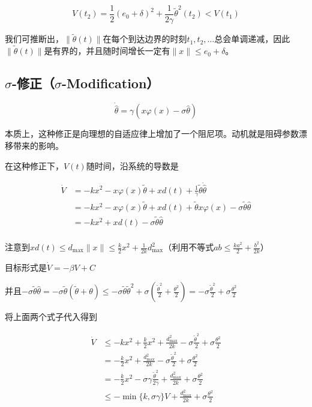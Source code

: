 \[V(t_{2}) = \frac{1}{2}(e_{0} + \delta)^{2} + \frac{1}{2\gamma}{\tilde{\theta}}^{2}(t_{2}) < V(t_{1})\]

我们可推断出，\(\parallel \tilde{\theta}(t) \parallel\)在每个到达边界的时刻\(t_{1},t_{2},\ldots\)总会单调递减，因此\(\parallel \tilde{\theta}(t) \parallel\)是有界的，并且随时间增长一定有\(\parallel x \parallel \leq e_{0} + \delta\)。

\subsection{\texorpdfstring{$\sigma$-修正（$\sigma$-Modification）}{σ-修正（σ-Modification）}}

\[\dot{\hat{\theta}} = \gamma(x\varphi(x) - \sigma\hat{\theta})\]

本质上，这种修正是向理想的自适应律上增加了一个阻尼项。动机就是阻碍参数漂移带来的影响。

在这种修正下，\(V(t)\)随时间，沿系统的导数是

\[\begin{matrix}
\dot{V} & = - kx^{2} - x\varphi(x)\tilde{\theta} + xd(t) + \frac{1}{\gamma}\tilde{\theta}\dot{\hat{\theta}} \\
 & = - kx^{2} - x\varphi(x)\tilde{\theta} + xd(t) + \tilde{\theta}x\varphi(x) - \sigma\tilde{\theta}\hat{\theta} \\
 & = - kx^{2} + xd(t) - \sigma\tilde{\theta}\hat{\theta} \\
\end{matrix}\]

注意到\(xd(t) \leq d_{\max} \parallel x \parallel \leq \frac{k}{2}x^{2} + \frac{1}{2k}d_{\max}^{2}\)（利用不等式\(ab \leq \frac{ka^{2}}{2} + \frac{b^{2}}{2k}\)）

目标形式是\(\dot{V} = - \beta V + C\)

并且\(- \sigma\tilde{\theta}\hat{\theta} = - \sigma\tilde{\theta}(\tilde{\theta} + \theta) \leq - \sigma\tilde{\theta}{\tilde{\theta}}^{2} + \sigma(\frac{{\tilde{\theta}}^{2}}{2} + \frac{\theta^{2}}{2}) = - \sigma\frac{{\tilde{\theta}}^{2}}{2} + \sigma\frac{\theta^{2}}{2}\)

将上面两个式子代入得到

\begin{align*}
\dot{V} & \leq - kx^{2} + \frac{k}{2}x^{2} + \frac{d_{\max}^{2}}{2k} - \sigma\frac{{\tilde{\theta}}^{2}}{2} + \sigma\frac{\theta^{2}}{2} \\
 & = - \frac{k}{2}x^{2} + \frac{d_{\max}^{2}}{2k} - \sigma\frac{{\tilde{\theta}}^{2}}{2} + \sigma\frac{\theta^{2}}{2} \\
 & = - \frac{k}{2}x^{2} - \sigma\gamma\frac{{\tilde{\theta}}^{2}}{2\gamma} + \frac{d_{\max}^{2}}{2k} + \sigma\frac{\theta^{2}}{2} \\
 & \leq - \min\{ k,\sigma\gamma\} V + \frac{d_{\max}^{2}}{2k} + \sigma\frac{\theta^{2}}{2}
\end{align*}

